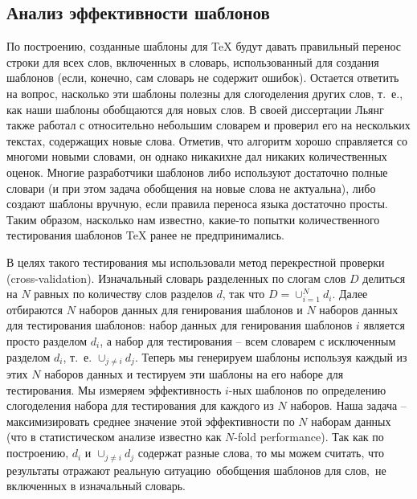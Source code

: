 \documentclass[12pt,a4paper,oneside]{extarticle}
\begin{document}
\subsection{Анализ эффективности шаблонов}

По построению, созданные шаблоны для \TeX{} будут давать правильный перенос строки для всех слов, включенных в словарь, использованный для создания шаблонов (если, конечно, сам словарь не содержит ошибок). Остается ответить на вопрос, насколько эти шаблоны полезны для слогоделения других слов, т.~е., как наши шаблоны обобщаются для новых слов. В своей диссертации Льянг также работал с относительно небольшим словарем и проверил его на нескольких текстах, содержащих новые слова. Отметив, что алгоритм хорошо справляется со многоми новыми словами, он однако никакихне дал никаких количественных оценок. Многие разработчики шаблонов либо используют достаточно полные словари (и при этом задача обобщения на новые слова не актуальна), либо создают шаблоны вручную, если правила переноса языка достаточно просты. Таким образом, насколько нам известно, какие-то попытки количественного тестирования шаблонов \TeX{} ранее не предпринимались.


В целях такого тестирования мы использовали метод перекрестной проверки (\textenglish{cross-validation}). Изначальный словарь разделенных по слогам слов $D$ делиться на $N$ равных по количеству слов разделов $d$, так что $D = \cup_{i = 1}^{N} d_i$. Далее отбираются $N$ наборов данных для генирования шаблонов и $N$ наборов данных для тестирования шаблонов: набор данных для генирования шаблонов $i$ является просто разделом $d_i$, а набор для тестирования -- всем словарем с исключенным разделом $d_i$, т.~е. $\cup_{j \neq i} d_j$. Теперь мы генерируем шаблоны используя каждый из этих $N$ наборов данных и тестируем эти шаблоны на его наборе для тестирования. Мы измеряем эффективность  $i$-ных шаблонов по определению слогоделения набора для тестирования для каждого из $N$ наборов. Наша задача -- максимизировать среднее значение этой эффективности по $N$ наборам данных (что в статистическом анализе известно как \textenglish{$N$-fold performance}). Так как по построению, $d_i$ и $\cup_{j \neq i} d_j$ содержат разные слова, то мы можем считать, что результаты отражают реальную ситуацию обобщения шаблонов для слов, не включенных в изначальный словарь.
\end{document}
